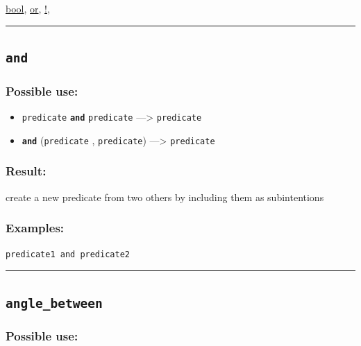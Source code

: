 \documentclass[]{book}
\providecommand{\tightlist}{%
  \setlength{\itemsep}{0pt}\setlength{\parskip}{0pt}}
\theoremstyle{definition}
\theoremstyle{definition}
\theoremstyle{definition}
\theoremstyle{remark}
\begin{document}
\href{operators-b-to-c.html\#bool}{bool},
\href{operators-n-to-r.html\#or}{or},
\href{operators-a-to-a.html\#!}{!},

\begin{center}\rule{0.5\linewidth}{\linethickness}\end{center}

\subsection{\texorpdfstring{\texttt{and}}{and}}\label{and-1}

\subsubsection{Possible use:}\label{possible-use-36}

\begin{itemize}
\tightlist
\item
  \texttt{predicate} \textbf{\texttt{and}} \texttt{predicate}
  ---\textgreater{} \texttt{predicate}
\item
  \textbf{\texttt{and}} (\texttt{predicate} , \texttt{predicate})
  ---\textgreater{} \texttt{predicate}
\end{itemize}

\subsubsection{Result:}\label{result-35}

create a new predicate from two others by including them as
subintentions

\subsubsection{Examples:}\label{examples-28}

\begin{verbatim}
predicate1 and predicate2 
\end{verbatim}

\begin{center}\rule{0.5\linewidth}{\linethickness}\end{center}

\subsection{\texorpdfstring{\texttt{angle\_between}}{angle\_between}}\label{angle_between}

\subsubsection{Possible use:}\label{possible-use-37}
\end{document}
